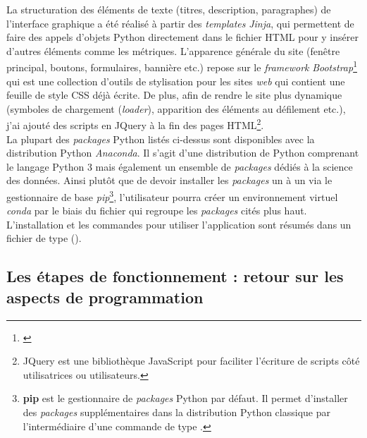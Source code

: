 La structuration des éléments de texte (titres, description, paragraphes) de l'interface graphique a été réalisé à partir des \textit{templates} \textit{Jinja}, qui permettent de faire des appels d'objets Python directement dans le fichier HTML pour y insérer d'autres éléments comme les métriques. L'apparence générale du site (fenêtre principal, boutons, formulaires, bannière etc.) repose sur le \textit{framework} \textit{Bootstrap}\footnote{\cite{otto_bootstrap_nodate}} qui est une collection d'outils de stylisation pour les sites \textit{web} qui contient une feuille de style CSS déjà écrite. De plus, afin de rendre le site plus dynamique (symboles de chargement (\textit{loader}), apparition des éléments au défilement etc.), j'ai ajouté des scripts en JQuery à la fin des pages HTML\footnote{JQuery est une bibliothèque JavaScript pour faciliter l'écriture de scripts côté utilisatrices ou utilisateurs.}.\\

La plupart des \textit{packages} Python listés ci-dessus sont disponibles avec la distribution Python \textit{Anaconda}. Il s'agit d'une distribution de Python comprenant le langage Python 3 mais également un ensemble de \textit{packages} dédiés à la science des données. Ainsi plutôt que de devoir installer les \textit{packages} un à un via le gestionnaire de base \textit{pip}\footnote{\textbf{pip} est le gestionnaire de \textit{packages} Python par défaut. Il permet d'installer des \textit{packages} supplémentaires dans la distribution Python classique par l'intermédiaire d'une commande de type .}, l'utilisateur pourra créer un environnement virtuel \textit{conda} par le biais du fichier  qui regroupe les \textit{packages} cités plus haut.\\ 

L'installation et les commandes pour utiliser l'application sont résumés dans un fichier de type  ().
\newpage
\subsection{Les étapes de fonctionnement : retour sur les aspects de programmation}

